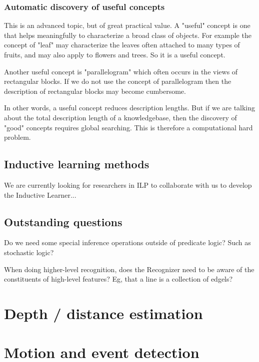 \subsubsection{Automatic discovery of useful concepts}

This is an advanced topic, but of great practical value. A "useful" concept is one that helps meaningfully to characterize a broad class of objects. For example the concept of "leaf" may characterize the leaves often attached to many types of fruits, and may also apply to flowers and trees. So it is a useful concept.

Another useful concept is "parallelogram" which often occurs in the views of rectangular blocks. If we do not use the concept of parallelogram then the description of rectangular blocks may become cumbersome.

 In other words, a useful concept reduces description lengths. But if we are talking about the total description length of a knowledgebase, then the discovery of "good" concepts requires global searching. This is therefore a computational hard problem. 

\subsection{Inductive learning methods}

\underconst

We are currently looking for researchers in ILP to collaborate with us to develop the Inductive Learner...

\subsection{Outstanding questions}

Do we need some special inference operations outside of predicate logic? Such as stochastic logic?

When doing higher-level recognition, does the Recognizer need to be aware of the constituents of high-level features? Eg, that a line is a collection of edgels?

\section{Depth / distance estimation}

\underconst

\section{Motion and event detection}

